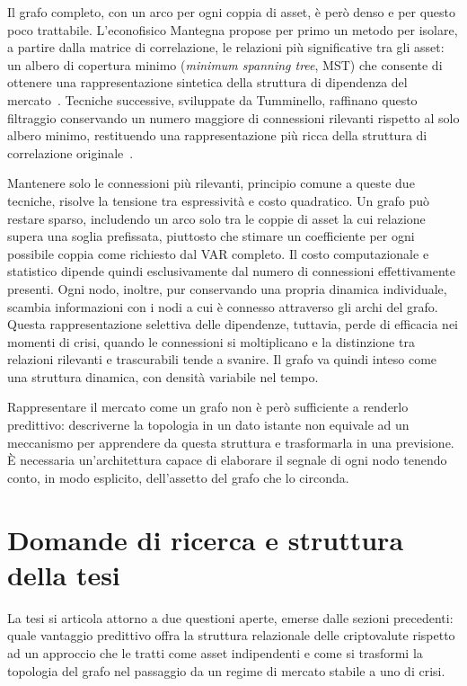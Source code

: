 Il grafo completo, con un arco per ogni coppia di asset, è però denso e per questo poco trattabile. L'econofisico Mantegna propose per primo un metodo per isolare, a partire dalla matrice di correlazione, le relazioni più significative tra gli asset: un albero di copertura minimo (\emph{minimum spanning tree}, MST) che consente di ottenere una rappresentazione sintetica della struttura di dipendenza del mercato~\cite{mantegna1999hierarchical}. Tecniche successive, sviluppate da Tumminello, raffinano questo filtraggio conservando un numero maggiore di connessioni rilevanti rispetto al solo albero minimo, restituendo una rappresentazione più ricca della struttura di correlazione originale~\cite{tumminello2005tool}.

Mantenere solo le connessioni più rilevanti, principio comune a queste due tecniche, risolve la tensione tra espressività e costo quadratico. Un grafo può restare sparso, includendo un arco solo tra le coppie di asset la cui relazione supera una soglia prefissata, piuttosto che stimare un coefficiente per ogni possibile coppia come richiesto dal VAR completo. Il costo computazionale e statistico dipende quindi esclusivamente dal numero di connessioni effettivamente presenti. Ogni nodo, inoltre, pur conservando una propria dinamica individuale, scambia informazioni con i nodi a cui è connesso attraverso gli archi del grafo. Questa rappresentazione selettiva delle dipendenze, tuttavia, perde di efficacia nei momenti di crisi, quando le connessioni si moltiplicano e la distinzione tra relazioni rilevanti e trascurabili tende a svanire. Il grafo va quindi inteso come una struttura dinamica, con densità variabile nel tempo.

Rappresentare il mercato come un grafo non è però sufficiente a renderlo predittivo: descriverne la topologia in un dato istante non equivale ad un meccanismo per apprendere da questa struttura e trasformarla in una previsione. È necessaria un'architettura capace di elaborare il segnale di ogni nodo tenendo conto, in modo esplicito, dell'assetto del grafo che lo circonda.

\section{Domande di ricerca e struttura della tesi}
\label{sec:objectives-research-questions}

La tesi si articola attorno a due questioni aperte, emerse dalle sezioni precedenti: quale vantaggio predittivo offra la struttura relazionale delle criptovalute rispetto ad un approccio che le tratti come asset indipendenti e come si trasformi la topologia del grafo nel passaggio da un regime di mercato stabile a uno di crisi.

